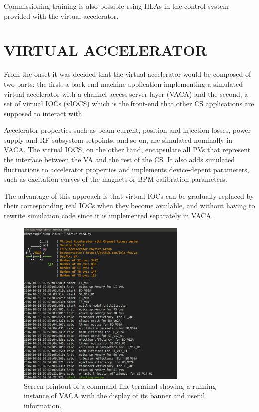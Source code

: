\documentclass[a4paper,
              ]{jacow}
\begin{document}
Commissioning training is also possible using HLAs in the control system provided with the virtual accelerator.

\section{VIRTUAL ACCELERATOR}
From the onset it was decided that the virtual accelerator would be composed of two parts: the first, a back-end machine
application implementing a simulated virtual accelerator with a channel access server layer (VACA) and the second, a set of
virtual IOCs (vIOCS) which is the front-end that other CS applications are supposed to interact with.

Accelerator properties such as beam current, position and injection losses, power supply and RF subsystem setpoints,
and so on, are simulated nominally in VACA. The virtual IOCS, on the other hand, encapsulate all PVs that represent the
interface between the VA and the rest of the CS. It also adds simulated fluctuations to accelerator properties and implements
device-depent parameters, such as excitation curves of the magnets or BPM calibration parameters.

The advantage of this approach is that virtual IOCs can be gradually replaced by their corresponding real IOCs when they become
available, and without having to rewrite simulation code since it is implemented separately in VACA.

\begin{figure}[!htb]
   \centering
   \includegraphics*[width=230pt]{WEPOPRPO21f1}
   \caption{Screen printout of a command line terminal showing a running instance of VACA with the display of its banner and useful information.}
   \label{fig:screen_print}
\end{figure}
\end{document}
